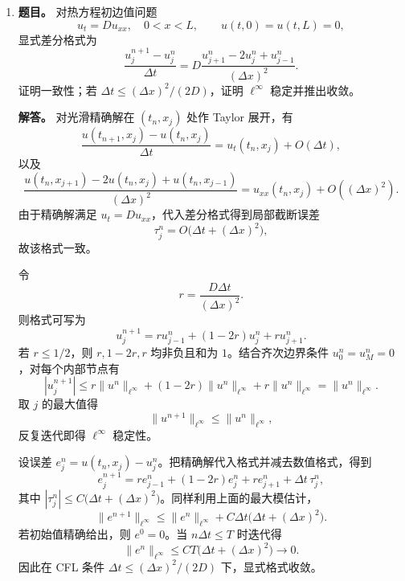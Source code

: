 ﻿\documentclass[UTF8,12pt]{ctexart}
\begin{document}
\begin{enumerate}[label=\textbf{\arabic*.},leftmargin=2.2em]
\textbf{解答。} 精确解展开为
\[
y(t+h)=y+hy'+\frac{h^2}{2}y''+\frac{h^3}{6}y^{(3)}+O(h^4).
\]
另一方面，沿精确解方向展开
\[
f(t+
\gamma h,y+
\gamma hf(t,y))=y'+
\gamma h y''+O(h^2).
\]
故方法给出
\[
y_{n+1}=y+h(\alpha+
\beta)y'+\beta\gamma h^2y''+O(h^3).
\]
一致性充要条件是一次项正确，即
\[
\alpha+
\beta=1.
\]
二阶还需
\[
\beta\gamma=\frac12.
\]
由于该方法只有两阶段显式 Runge--Kutta 型，不能同时匹配三阶 Butcher 条件，故阶数不超过二。

对 \(y'=-\lambda y\)，二阶条件下稳定函数为
\[
R(-\lambda h)=1-
\lambda h+\frac{(\lambda h)^2}{2}.
\]
设 \(s=
\lambda h\ge0\)。数值序列 \(y_n=R(-s)^n\) 有界当且仅当
\[
|1-s+s^2/2|\le1.
\]
由于 \(1-s+s^2/2\ge -1\) 恒成立，且 \(1-s+s^2/2\le1\) 等价于 \(0\le s\le2\)，故
\[
h\le\frac2\lambda.
\]
当 \(0\le s\le2\) 时，Taylor 余项给出
\[
|e^{-s}-(1-s+s^2/2)|\le\frac{s^3}{6}.
\]
利用 \(|R(-s)|\le1\)、\(|e^{-s}|\le1\)，逐步比较得
\[
|e^{-
\lambda t_n}-R(-
\lambda h)^n|
\le n\frac{(\lambda h)^3}{6}
=\frac16\lambda^3h^2t_n.
\]

\item \textbf{题目。} 对热方程初边值问题
\[
u_t=Du_{xx},\quad 0<x<L,
\qquad u(t,0)=u(t,L)=0,
\]
显式差分格式为
\[
\frac{u_j^{n+1}-u_j^n}{\Delta t}
=D\frac{u_{j+1}^n-2u_j^n+u_{j-1}^n}{(\Delta x)^2}.
\]
证明一致性；若 \(\Delta t\le(\Delta x)^2/(2D)\)，证明 \(\ell^\infty\) 稳定并推出收敛。

\textbf{解答。} 对光滑精确解在 \((t_n,x_j)\) 处作 Taylor 展开，有
\[
\frac{u(t_{n+1},x_j)-u(t_n,x_j)}{\Delta t}
=u_t(t_n,x_j)+O(\Delta t),
\]
以及
\[
\frac{u(t_n,x_{j+1})-2u(t_n,x_j)+u(t_n,x_{j-1})}{(\Delta x)^2}
=u_{xx}(t_n,x_j)+O((\Delta x)^2).
\]
由于精确解满足 \(u_t=Du_{xx}\)，代入差分格式得到局部截断误差
\[
\tau_j^n=O\bigl(\Delta t+(\Delta x)^2\bigr),
\]
故该格式一致。

令
\[
r=\frac{D\Delta t}{(\Delta x)^2}.
\]
则格式可写为
\[
u_j^{n+1}=ru_{j-1}^n+(1-2r)u_j^n+ru_{j+1}^n.
\]
若 \(r\le1/2\)，则 \(r,1-2r,r\) 均非负且和为 \(1\)。结合齐次边界条件 \(u_0^n=u_M^n=0\)，对每个内部节点有
\[
|u_j^{n+1}|\le r\|u^n\|_{\ell^\infty}
+(1-2r)\|u^n\|_{\ell^\infty}
+r\|u^n\|_{\ell^\infty}
=\|u^n\|_{\ell^\infty}.
\]
取 \(j\) 的最大值得
\[
\|u^{n+1}\|_{\ell^\infty}\le\|u^n\|_{\ell^\infty},
\]
反复迭代即得 \(\ell^\infty\) 稳定性。

设误差 \(e_j^n=u(t_n,x_j)-u_j^n\)。把精确解代入格式并减去数值格式，得到
\[
e_j^{n+1}=re_{j-1}^n+(1-2r)e_j^n+re_{j+1}^n+\Delta t\,\tau_j^n,
\]
其中 \(|\tau_j^n|\le C\bigl(\Delta t+(\Delta x)^2\bigr)\)。同样利用上面的最大模估计，
\[
\|e^{n+1}\|_{\ell^\infty}
\le \|e^n\|_{\ell^\infty}
+C\Delta t\bigl(\Delta t+(\Delta x)^2\bigr).
\]
若初始值精确给出，则 \(e^0=0\)。当 \(n\Delta t\le T\) 时迭代得
\[
\|e^n\|_{\ell^\infty}
\le CT\bigl(\Delta t+(\Delta x)^2\bigr)\to0.
\]
因此在 CFL 条件 \(\Delta t\le(\Delta x)^2/(2D)\) 下，显式格式收敛。


\end{enumerate}
\end{document}
